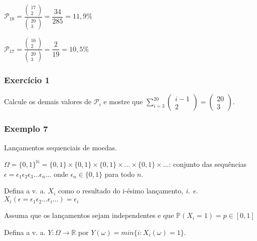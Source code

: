 \documentclass[a4paper]{article}
\begin{document}
	$\mathcal{P}_{18} = \frac{\begin{pmatrix}
		17 \\
		2
		\end{pmatrix}}{\begin{pmatrix}
		20 \\
		3
		\end{pmatrix}} = \dfrac{34}{285} = 11,9\%$
	
	$\mathcal{P}_{17} = \frac{\begin{pmatrix}
		16 \\
		2
		\end{pmatrix}}{\begin{pmatrix}
		20 \\
		3
		\end{pmatrix}} = \dfrac{2}{19} = 10,5\%$
	
	\subsubsection{Exercício 1}
	
	\noindent Calcule os demais valores de $\mathcal{P}_{i}$ e mostre que $\sum_{i=3}^{20} \begin{pmatrix}
	i-1 \\
	2
	\end{pmatrix} = \begin{pmatrix}
	20 \\
	3
	\end{pmatrix}$.
	
	\subsubsection{Exemplo 7}
	
	\noindent Lançamentos sequenciais de moedas.
	
	$\varOmega = \{0,1\}^{\mathbb{N}} = \{0,1\} \times \{0,1\} \times \{0,1\} \times \dots \times \{0,1\} \times \dots$: conjunto das sequências $\epsilon = \epsilon_{1} \epsilon_{2} \epsilon_{3} \dots \epsilon_{n} \dots$ onde $\epsilon_{n} \in \{0,1\}$ para todo $n$.
	
	\noindent Defina a v. a. $X_{i}$ como o resultado do i-ésimo lançamento, \textit{i. e.} $X_{i}(\epsilon = \epsilon_{1} \epsilon_{2} \dots \epsilon_{i} \dots) = \epsilon_{i}$
	
	\noindent Assuma que os lançamentos sejam independentes e que $\boxed{\mathbb{P}(X_{i}=1) = p \in [0,1]}$
	
	\noindent Defina a v. a. $Y: \varOmega \rightarrow \mathbb{R}$ por $Y(\omega) = min \{i:X_{i}(\omega)=1\}$.
	
\end{document}
